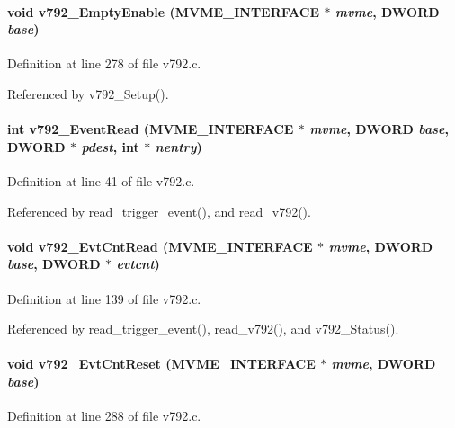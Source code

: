 \paragraph[{v792\_\-EmptyEnable}]{\setlength{\rightskip}{0pt plus 5cm}void v792\_\-EmptyEnable ({\bf MVME\_\-INTERFACE} $\ast$ {\em mvme}, \/  {\bf DWORD} {\em base})}\hfill\label{v792_8h_ab61c57bd4759a155b2a6735b955daa5d}


Definition at line 278 of file v792.c.

Referenced by v792\_\-Setup().
\paragraph[{v792\_\-EventRead}]{\setlength{\rightskip}{0pt plus 5cm}int v792\_\-EventRead ({\bf MVME\_\-INTERFACE} $\ast$ {\em mvme}, \/  {\bf DWORD} {\em base}, \/  {\bf DWORD} $\ast$ {\em pdest}, \/  int $\ast$ {\em nentry})}\hfill\label{v792_8h_a723985757a28f135d0b1224a85accb62}


Definition at line 41 of file v792.c.

Referenced by read\_\-trigger\_\-event(), and read\_\-v792().
\paragraph[{v792\_\-EvtCntRead}]{\setlength{\rightskip}{0pt plus 5cm}void v792\_\-EvtCntRead ({\bf MVME\_\-INTERFACE} $\ast$ {\em mvme}, \/  {\bf DWORD} {\em base}, \/  {\bf DWORD} $\ast$ {\em evtcnt})}\hfill\label{v792_8h_a93c9ec6788ab26b8dc1ca782761f91ac}


Definition at line 139 of file v792.c.

Referenced by read\_\-trigger\_\-event(), read\_\-v792(), and v792\_\-Status().
\paragraph[{v792\_\-EvtCntReset}]{\setlength{\rightskip}{0pt plus 5cm}void v792\_\-EvtCntReset ({\bf MVME\_\-INTERFACE} $\ast$ {\em mvme}, \/  {\bf DWORD} {\em base})}\hfill\label{v792_8h_ac55abf9ce7cd67d18ded979ab4b54fe9}


Definition at line 288 of file v792.c.
